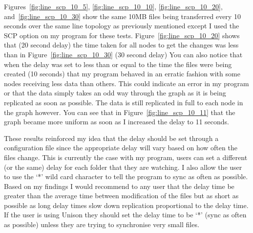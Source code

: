 \documentclass[12pt]{article}
\begin{document}
Figures~\ref{fig:line_scp_10_5},
\ref{fig:line_scp_10_10}, \ref{fig:line_scp_10_20},
and~\ref{fig:line_scp_10_30} show the same 10MB files
being transferred every 10 seconds over the same line topology
as previously
mentioned except I used the SCP option on my program for
these tests.
Figure~\ref{fig:line_scp_10_20} shows that
(20 second delay) the time taken for all nodes to get
the changes was less than
in Figure~\ref{fig:line_scp_10_30} (30 second delay)
You can also notice that when the delay was
set to less than or equal to the time the files were
being created (10 seconds) that my program behaved 
in an erratic fashion with some nodes receiving less data
than others. This could indicate an error in my program
or that the data simply takes an odd way through
the graph as it is being replicated as soon as possible.
The data is still replicated in full to each node in the
graph however.
You can see that in Figure~\ref{fig:line_scp_10_11}
that the graph became more uniform as
soon as I increased the delay to 11 seconds.

These results reinforced my idea that the delay should
be set through a configuration file since
the appropriate delay will vary based on how often
the files change. This is currently the case with my
program, users can set a different (or the same)
delay for each folder that they are watching. I
also allow the user to use the `*' wild card character
to tell the program to sync as often as possible. Based
on my findings I would recommend to any user that
the delay time be greater than the average time between
modification of the files but as short as possible as
long delay times slow down replication proportional
to the delay time.
If the user is using Unison they should
set the delay time to be `*' (sync as often as possible)
unless they are trying to synchronise very small files.
\end{document}
